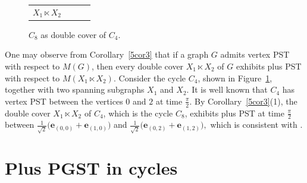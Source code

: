 \documentclass[12pt,a4paper]{article}
\newtheorem{lem}{Lemma}
\def \e {{\bf e}}
\def \e {{\mathbf e}}
\newcommand{\ob}[1]{\left(#1\right)}
\begin{document}
\begin{figure}[]
\begin{tabular}{cccc}
\begin{minipage}{0.22\textwidth}
$X_1 \ltimes X_2$
\end{minipage}

\end{tabular}

\caption{$C_8$ as double cover of $C_4.$}
\label{5fig3}
\end{figure}

One may observe from Corollary~\ref{5cor3} that if a graph $G$ admits vertex PST with respect to $M(G)$, then every double cover $X_1\ltimes X_2$ of $G$ exhibits plus PST with respect to $M(X_1\ltimes X_2).$ Consider the cycle $C_4$, shown in Figure~\ref{5fig3}, together with two spanning subgraphs $X_1$ and $X_2$. It is well known that $C_4$ has vertex PST between the vertices $0$ and $2$ at time $\frac{\pi}{2}$. By Corollary~\ref{5cor3}(1), the double cover $X_1\ltimes X_2$ of $C_4$, which is the cycle $C_8$, exhibits plus PST at time $\frac{\pi}{2}$ between $\frac{1}{\sqrt{2}}\big(\e_{(0,0)}+\e_{(1,0)}\big)$ and $\frac{1}{\sqrt{2}}\big(\e_{(0,2)}+\e_{(1,2)}\big),$  which is consistent with \cite[Theorem 6.5]{kim}.

\section{Plus PGST in cycles}\label{5sec5}

\end{document}
